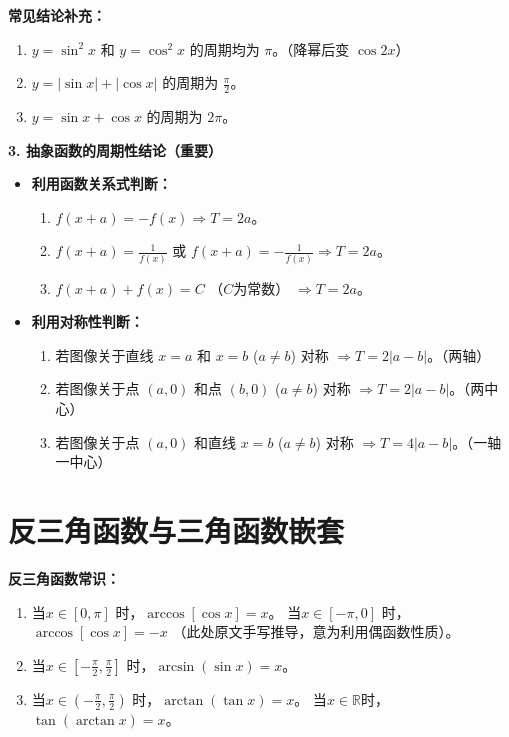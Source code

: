 \documentclass[a4paper,12pt]{ctexart}
\newenvironment{rednote}
  {\begin{tcolorbox}[colback=notepurple, colframe=highlightred, boxrule=1pt, title=\textbf{重点/技巧/手写笔记}]}
  {\end{tcolorbox}}
\begin{document}
\begin{rednote}
    \textbf{常见结论补充：}
    \begin{enumerate}
        \item $y = \sin^2 x$ 和 $y = \cos^2 x$ 的周期均为 $\pi$。（降幂后变 $\cos 2x$）
        \item $y = |\sin x| + |\cos x|$ 的周期为 $\frac{\pi}{2}$。
        \item $y = \sin x + \cos x$ 的周期为 $2\pi$。
    \end{enumerate}
\end{rednote}

\noindent \textbf{3. 抽象函数的周期性结论（重要）}
\begin{itemize}
    \item \textbf{利用函数关系式判断：}
    \begin{enumerate}
        \item $f(x+a) = -f(x) \Rightarrow T = 2a$。
        \item $f(x+a) = \frac{1}{f(x)}$ 或 $f(x+a) = -\frac{1}{f(x)} \Rightarrow T = 2a$。
        \item $f(x+a) + f(x) = C$ （$C$为常数） $\Rightarrow T = 2a$。
    \end{enumerate}
    \item \textbf{利用对称性判断：}
    \begin{enumerate}
        \item 若图像关于直线 $x=a$ 和 $x=b$ ($a \neq b$) 对称 $\Rightarrow T = 2|a-b|$。（两轴）
        \item 若图像关于点 $(a, 0)$ 和点 $(b, 0)$ ($a \neq b$) 对称 $\Rightarrow T = 2|a-b|$。（两中心）
        \item 若图像关于点 $(a, 0)$ 和直线 $x=b$ ($a \neq b$) 对称 $\Rightarrow T = 4|a-b|$。（一轴一中心）
    \end{enumerate}
\end{itemize}

\section*{反三角函数与三角函数嵌套}

\noindent \textbf{反三角函数常识：}
\begin{enumerate}
    \item 当$x \in [0, \pi]$ 时，$\arccos[\cos x] = x$。
          当$x \in [-\pi, 0]$ 时，$\arccos[\cos x] = -x$ （此处原文手写推导，意为利用偶函数性质）。
    \item 当$x \in [-\frac{\pi}{2}, \frac{\pi}{2}]$ 时，$\arcsin(\sin x) = x$。
    \item 当$x \in (-\frac{\pi}{2}, \frac{\pi}{2})$ 时，$\arctan(\tan x) = x$。
          当$x \in \mathbb{R}$时，$\tan(\arctan x) = x$。
\end{enumerate}
\end{document}
